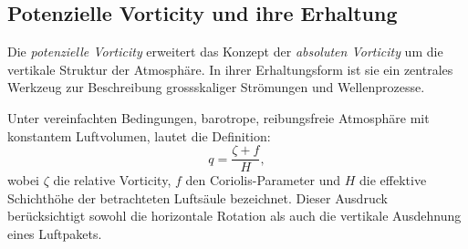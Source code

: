 
\subsection{Potenzielle Vorticity und ihre Erhaltung}

Die \emph{potenzielle Vorticity} erweitert das Konzept der \emph{absoluten
	Vorticity} um die vertikale Struktur der Atmosphäre. In ihrer Erhaltungsform
ist sie ein zentrales Werkzeug zur Beschreibung grossskaliger Strömungen und
Wellenprozesse.

Unter vereinfachten Bedingungen, barotrope, reibungsfreie Atmosphäre mit
konstantem Luftvolumen, lautet die Definition:
\begin{equation}
	q = \frac{\zeta + f}{H},
	\label{rossby:eq:potential_vorticity}
\end{equation}
wobei \(\zeta\) die relative Vorticity, \(f\) den Coriolis-Parameter und \(H\) die effektive Schichthöhe der betrachteten Luftsäule bezeichnet.
Dieser Ausdruck berücksichtigt sowohl die horizontale Rotation als auch die vertikale Ausdehnung eines Luftpakets.



